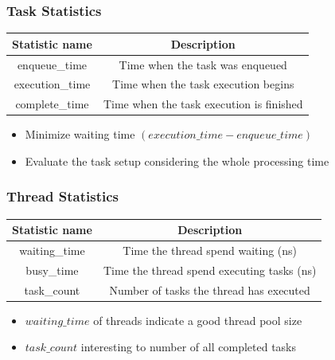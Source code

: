 \documentclass{beamer}
\begin{document}
\begin{frame}
	\frametitle{Task Statistics}
	\begin{center}
		\begin{tabular}{ c c }
			\hline
			\textbf{Statistic name}&\textbf{Description}\\
			\hline
			enqueue\_time & Time when the task was enqueued \\
			execution\_time & Time when the task execution begins \\
			complete\_time & Time when the task execution is finished \\
			\hline
		\end{tabular}
		\label{tab2}
	\end{center}
	\begin{itemize}
		\item Minimize waiting time $(execution\_time - enqueue\_time)$
		\item Evaluate the task setup considering the whole processing time 
	\end{itemize}
\end{frame}

\begin{frame}
	\frametitle{Thread Statistics}
	\begin{center}
		\begin{tabular}{ c c }
			\hline
			\textbf{Statistic name}&\textbf{Description}\\
			\hline
			waiting\_time & Time the thread spend waiting (ns) \\
			busy\_time & Time the thread spend executing tasks (ns)\\
			task\_count & Number of tasks the thread has executed \\
			\hline
		\end{tabular}
		\label{tab3}
	\end{center}
	\begin{itemize}
		\item $waiting\_time$ of threads indicate a good thread pool size
		\item $task\_count$ interesting to number of all completed tasks
	\end{itemize}
\end{frame}
\end{document}

